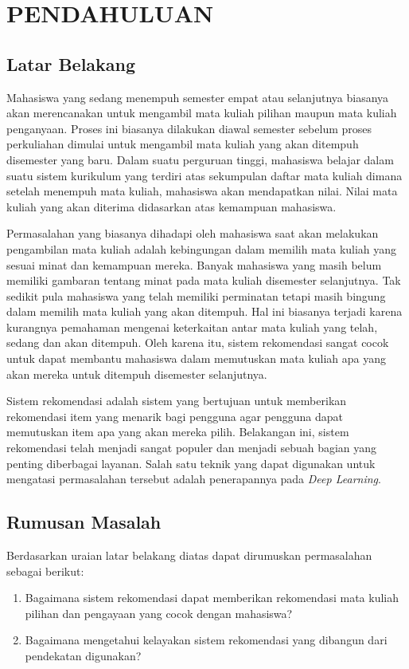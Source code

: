 \chapter{PENDAHULUAN}

\section{Latar Belakang}

Mahasiswa yang sedang menempuh semester empat atau selanjutnya biasanya akan merencanakan untuk mengambil
mata kuliah pilihan maupun mata kuliah penganyaan. Proses ini biasanya dilakukan diawal semester sebelum proses perkuliahan
dimulai untuk mengambil mata kuliah yang akan ditempuh disemester yang baru. Dalam suatu perguruan tinggi, mahasiswa belajar dalam suatu
sistem kurikulum yang terdiri atas sekumpulan daftar mata kuliah dimana setelah menempuh mata kuliah,
mahasiswa akan mendapatkan nilai. Nilai mata kuliah yang akan diterima didasarkan atas kemampuan
mahasiswa.

Permasalahan yang biasanya dihadapi oleh mahasiswa saat akan melakukan pengambilan mata kuliah adalah kebingungan dalam
memilih mata kuliah yang sesuai minat dan kemampuan mereka. Banyak mahasiswa yang masih belum memiliki gambaran tentang
minat pada mata kuliah disemester selanjutnya. Tak sedikit pula mahasiswa yang telah memiliki perminatan tetapi masih
bingung dalam memilih mata kuliah yang akan ditempuh. Hal ini biasanya terjadi karena kurangnya pemahaman mengenai
keterkaitan antar mata kuliah yang telah, sedang dan akan ditempuh. Oleh karena itu, sistem rekomendasi sangat cocok untuk
dapat membantu mahasiswa dalam memutuskan mata kuliah apa yang akan mereka untuk ditempuh disemester selanjutnya.

Sistem rekomendasi adalah sistem yang bertujuan untuk memberikan rekomendasi item yang menarik bagi pengguna agar pengguna
dapat memutuskan item apa yang akan mereka pilih. Belakangan ini, sistem rekomendasi telah menjadi sangat populer dan menjadi
sebuah bagian yang penting diberbagai layanan. Salah satu teknik yang dapat digunakan untuk mengatasi permasalahan tersebut adalah
penerapannya pada \emph{Deep Learning}.

\section{Rumusan Masalah}
Berdasarkan uraian latar belakang diatas dapat dirumuskan permasalahan sebagai berikut:
\begin{enumerate}[noitemsep]
      \item Bagaimana sistem rekomendasi dapat memberikan rekomendasi mata kuliah pilihan dan pengayaan
            yang cocok dengan mahasiswa?
      \item Bagaimana mengetahui kelayakan sistem rekomendasi yang dibangun dari pendekatan digunakan?
\end{enumerate}

